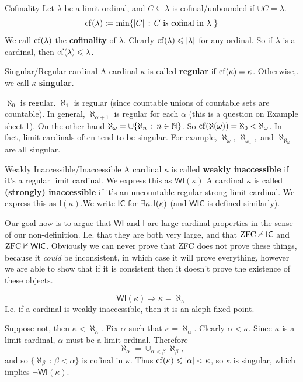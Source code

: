 \documentclass{article}
\begin{document}
\begin{enumerate}
    \begin{fancydefine}{Cofinality}
        Let $\lambda$ be a limit ordinal, and $C \subseteq \lambda$ is cofinal/unbounded if $\cup C = \lambda$. \[ \operatorname{cf}(\lambda) := \min \{ |C| \, : \, C \text{ is cofinal in $\lambda$ }\}\]
        We call $\operatorname{cf}(\lambda)$ the \textbf{cofinality} of $\lambda$. Clearly $\operatorname{cf}(\lambda) \leqslant |\lambda|$ for any ordinal. So if $\lambda$ is a cardinal, then $\operatorname{cf}(\lambda) \leqslant \lambda$. 
    \end{fancydefine}
    \begin{fancydefine}{Singular/Regular cardinal}
        A cardinal $\kappa$ is called \textbf{regular} if $\operatorname{cf}(\kappa) = \kappa$. Otherwise,. we call $\kappa$ \textbf{singular}.
    \end{fancydefine}
    \begin{exs*}
        $\aleph_{0}$ is regular. $\aleph_{1}$ is regular (since countable unions of countable sets are countable). In general, $\aleph_{\alpha+1}$ is regular for each $\alpha$ (this is a question on Example sheet 1).\gap 
        On the other hand $\aleph_{\omega} = \cup \{ \aleph_{n} \, : \, n \in \mathbb{N}\}$. So $\operatorname{cf}(\aleph(\omega)) = \aleph_{0} < \aleph_{\omega}$. In fact, limit cardinals often tend to be singular. For example, $\aleph_{\omega}, \, \aleph_{\omega_{1}},$ and $\aleph_{\aleph_{\omega}}$ are all singular.
    \end{exs*}
\end{enumerate}

\begin{fancydefine}{Weakly Inaccessible/Inaccessible}
    A cardinal $\kappa$ is called \textbf{weakly inaccessible} if it's a regular limit cardinal. We express this as $\mathsf{WI}(\kappa)$\gap 
    A cardinal $\kappa$ is called \textbf{(strongly) inaccessible} if it's an uncountable regular strong limit cardinal. We express this as $\mathsf{I}(\kappa)$.\gap We write $\mathsf{IC}$ for $\exists \kappa. \, \mathsf{I}(\kappa)$ (and $\mathsf{WIC}$ is defined similarly).
\end{fancydefine}
Our goal now is to argue that $\mathsf{WI}$ and $\mathsf{I}$ are large cardinal properties in the sense of our non-definition. I.e. that they are both very large, and that $\operatorname{ZFC} \nvdash \mathsf{IC}$ and $\operatorname{ZFC} \nvdash \mathsf{WIC}$. \gap Obviously we can never prove that ZFC does not prove these things, because it \textit{could} be inconsistent, in which case it will prove everything, however we are able to show that if it is consistent then it doesn't prove the existence of these objects.
\begin{fancyprop}{}
    \[ \mathsf{WI}(\kappa) \Rightarrow \kappa = \aleph_{\kappa}\] I.e. if a cardinal is weakly inaccessible, then it is an aleph fixed point.
\end{fancyprop}
\proof Suppose not, then $\kappa < \aleph_{\kappa}$. Fix $\alpha$ such that $\kappa = \aleph_{\alpha}$. Clearly $\alpha < \kappa$. Since $\kappa$ is a limit cardinal, $\alpha$ must be a limit ordinal. Therefore \[ \aleph_{\alpha} = \cup_{\alpha < \beta} \aleph_{\beta},\]
and so $\{\aleph_{\beta} \, : \, \beta < \alpha\}$ is cofinal in $\kappa$. Thus $\operatorname{cf}(\kappa) \leqslant |\alpha| < \kappa$, so $\kappa$ is singular, which implies $\neg \mathsf{WI}(\kappa)$. \endproof
\end{document}
